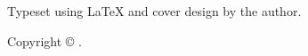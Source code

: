 {  Typeset using \LaTeX{} and cover design by the author.
  
  Copyright \copyright{} \theyear{} \theauthor{}.
  
  \vspace{1em}
  
}

\cleardoublepage
